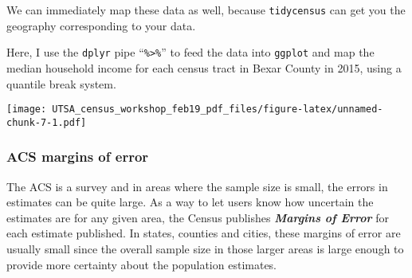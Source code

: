 \documentclass[]{article}
\newenvironment{Shaded}{\begin{snugshade}}{\end{snugshade}}
\newcommand{\KeywordTok}[1]{\textcolor[rgb]{0.13,0.29,0.53}{\textbf{#1}}}
\newcommand{\DataTypeTok}[1]{\textcolor[rgb]{0.13,0.29,0.53}{#1}}
\newcommand{\DecValTok}[1]{\textcolor[rgb]{0.00,0.00,0.81}{#1}}
\newcommand{\StringTok}[1]{\textcolor[rgb]{0.31,0.60,0.02}{#1}}
\newcommand{\OperatorTok}[1]{\textcolor[rgb]{0.81,0.36,0.00}{\textbf{#1}}}
\newcommand{\NormalTok}[1]{#1}
\begin{document}
We can immediately map these data as well, because \texttt{tidycensus}
can get you the geography corresponding to your data.

Here, I use the \texttt{dplyr} pipe ``\texttt{\%\textgreater{}\%}'' to
feed the data into \texttt{ggplot} and map the median household income
for each census tract in Bexar County in 2015, using a quantile break
system.

\begin{Shaded}
\end{Shaded}

\texttt{[image: UTSA\_census\_workshop\_feb19\_pdf\_files/figure-latex/unnamed-chunk-7-1.pdf]}

\newpage

\subsubsection{ACS margins of error}\label{acs-margins-of-error}

The ACS is a survey and in areas where the sample size is small, the
errors in estimates can be quite large. As a way to let users know how
uncertain the estimates are for any given area, the Census publishes
\textbf{\emph{Margins of Error}} for each estimate published. In states,
counties and cities, these margins of error are usually small since the
overall sample size in those larger areas is large enough to provide
more certainty about the population estimates.
\end{document}
